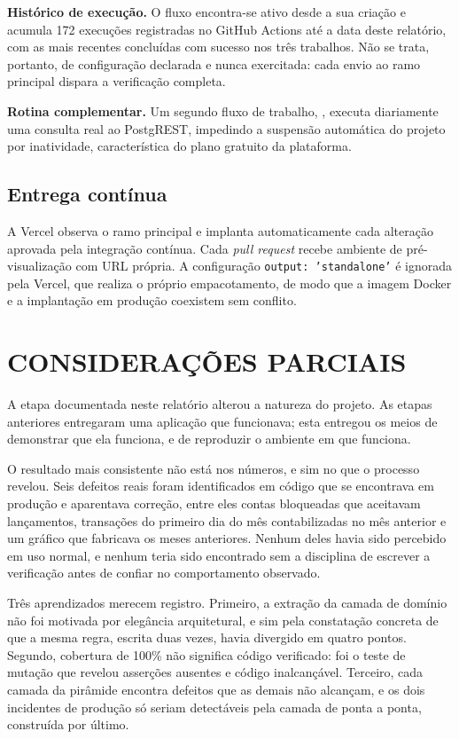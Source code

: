 \documentclass[12pt,a4paper]{article}
\begin{document}
\textbf{Histórico de execução.} O fluxo encontra-se ativo desde a sua criação e acumula 172 execuções registradas no GitHub Actions até a data deste relatório, com as mais recentes concluídas com sucesso nos três trabalhos. Não se trata, portanto, de configuração declarada e nunca exercitada: cada envio ao ramo principal dispara a verificação completa.

\textbf{Rotina complementar.} Um segundo fluxo de trabalho, , executa diariamente uma consulta real ao PostgREST, impedindo a suspensão automática do projeto por inatividade, característica do plano gratuito da plataforma.

\subsection{Entrega contínua}

A Vercel observa o ramo principal e implanta automaticamente cada alteração aprovada pela integração contínua. Cada \textit{pull request} recebe ambiente de pré-visualização com URL própria. A configuração \texttt{output: 'standalone'} é ignorada pela Vercel, que realiza o próprio empacotamento, de modo que a imagem Docker e a implantação em produção coexistem sem conflito.

\section{CONSIDERAÇÕES PARCIAIS}

A etapa documentada neste relatório alterou a natureza do projeto. As etapas anteriores entregaram uma aplicação que funcionava; esta entregou os meios de demonstrar que ela funciona, e de reproduzir o ambiente em que funciona.

O resultado mais consistente não está nos números, e sim no que o processo revelou. Seis defeitos reais foram identificados em código que se encontrava em produção e aparentava correção, entre eles contas bloqueadas que aceitavam lançamentos, transações do primeiro dia do mês contabilizadas no mês anterior e um gráfico que fabricava os meses anteriores. Nenhum deles havia sido percebido em uso normal, e nenhum teria sido encontrado sem a disciplina de escrever a verificação antes de confiar no comportamento observado.

Três aprendizados merecem registro. Primeiro, a extração da camada de domínio não foi motivada por elegância arquitetural, e sim pela constatação concreta de que a mesma regra, escrita duas vezes, havia divergido em quatro pontos. Segundo, cobertura de 100\% não significa código verificado: foi o teste de mutação que revelou asserções ausentes e código inalcançável. Terceiro, cada camada da pirâmide encontra defeitos que as demais não alcançam, e os dois incidentes de produção só seriam detectáveis pela camada de ponta a ponta, construída por último.
\end{document}
